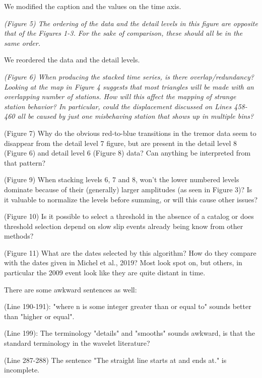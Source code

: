 \documentclass[letterpaper, 12pt]{article}
\begin{document}
\bigskip

We modified the caption and the values on the time axis.

\bigskip

\textit{(Figure 5) The ordering of the data and the detail levels in this figure are opposite that of the Figures 1-3. For the sake of comparison, these should all be in the same order.}

\bigskip

We reordered the data and the detail levels.

\bigskip

\textit{(Figure 6) When producing the stacked time series, is there overlap/redundancy? Looking at the map in Figure 4 suggests that most triangles will be made with an overlapping number of stations. How will this affect the mapping of strange station behavior? In particular, could the displacement discussed on Lines 458-460 all be caused by just one misbehaving station that shows up in multiple bins?}


(Figure 7) Why do the obvious red-to-blue transitions in the tremor data seem to disappear from the detail level 7 figure, but are present in the detail level 8 (Figure 6) and detail level 6 (Figure 8) data? Can anything be interpreted from that pattern?

(Figure 9) When stacking levels 6, 7 and 8, won't the lower numbered levels dominate because of their (generally) larger amplitudes (as seen in Figure 3)? Is it valuable to normalize the levels before summing, or will this cause other issues?

(Figure 10) Is it possible to select a threshold in the absence of a catalog or does threshold selection depend on slow slip events already being know from other methods?

(Figure 11) What are the dates selected by this algorithm? How do they compare with the dates given in Michel et al., 2019? Most look spot on, but others, in particular the 2009 event look like they are quite distant in time.

There are some awkward sentences as well:

 (Line 190-191): "where n is some integer greater than or equal to" sounds better than "higher or equal".

(Line 199): The terminology "details" and "smooths" sounds awkward, is that the standard terminology in the wavelet literature?

(Line 287-288) The sentence "The straight line starts at and ends at." is incomplete.
\end{document}
